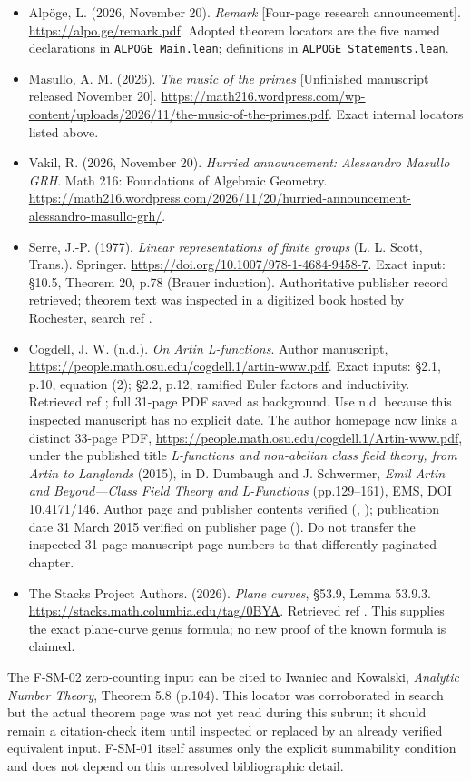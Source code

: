 \documentclass[11pt,a4paper]{article}
\providecommand{\tightlist}{\setlength{\itemsep}{0pt}\setlength{\parskip}{0pt}}
\theoremstyle{definition}\newtheorem{definition}[theorem]{Definition}
\theoremstyle{remark}\newtheorem{remark}[theorem]{Remark}
\begin{document}
\begin{itemize}
\tightlist
\item
  Alpöge, L. (2026, November 20). \emph{Remark} {[}Four-page research
  announcement{]}. \url{https://alpo.ge/remark.pdf}. Adopted theorem
  locators are the five named declarations in
  \nolinkurl{ALPOGE_Main.lean}; definitions in
  \nolinkurl{ALPOGE_Statements.lean}.
\item
  Masullo, A. M. (2026). \emph{The music of the primes} {[}Unfinished
  manuscript released November 20{]}.
  \url{https://math216.wordpress.com/wp-content/uploads/2026/11/the-music-of-the-primes.pdf}.
  Exact internal locators listed above.
\item
  Vakil, R. (2026, November 20). \emph{Hurried announcement: Alessandro
  Masullo GRH}. Math 216: Foundations of Algebraic Geometry.
  \url{https://math216.wordpress.com/2026/11/20/hurried-announcement-alessandro-masullo-grh/}.
\item
  Serre, J.-P. (1977). \emph{Linear representations of finite groups}
  (L. L. Scott, Trans.). Springer.
  \url{https://doi.org/10.1007/978-1-4684-9458-7}. Exact input: §10.5,
  Theorem 20, p.78 (Brauer induction). Authoritative publisher record
  retrieved; theorem text was inspected in a digitized book hosted by
  Rochester, search ref \nolinkurl{}.
\item
  Cogdell, J. W. (n.d.). \emph{On Artin L-functions}. Author manuscript,
  \url{https://people.math.osu.edu/cogdell.1/artin-www.pdf}. Exact
  inputs: §2.1, p.10, equation (2); §2.2, p.12, ramified Euler factors
  and inductivity. Retrieved ref \nolinkurl{}; full
  31-page PDF saved as background. Use n.d. because this inspected
  manuscript has no explicit date. The author homepage now links a
  distinct 33-page PDF,
  \url{https://people.math.osu.edu/cogdell.1/Artin-www.pdf}, under the
  published title \emph{L-functions and non-abelian class field theory,
  from Artin to Langlands} (2015), in D. Dumbaugh and J. Schwermer,
  \emph{Emil Artin and Beyond---Class Field Theory and L-Functions}
  (pp.129--161), EMS, DOI 10.4171/146. Author page and publisher
  contents verified (\nolinkurl{},
  \nolinkurl{}); publication date 31 March 2015
  verified on publisher page (\nolinkurl{}). Do not
  transfer the inspected 31-page manuscript page numbers to that
  differently paginated chapter.
\item
  The Stacks Project Authors. (2026). \emph{Plane curves}, §53.9, Lemma
  53.9.3. \url{https://stacks.math.columbia.edu/tag/0BYA}. Retrieved ref
  \nolinkurl{}. This supplies the exact plane-curve genus
  formula; no new proof of the known formula is claimed.
\end{itemize}

The F-SM-02 zero-counting input can be cited to Iwaniec and Kowalski,
\emph{Analytic Number Theory}, Theorem 5.8 (p.104). This locator was
corroborated in search but the actual theorem page was not yet read
during this subrun; it should remain a citation-check item until
inspected or replaced by an already verified equivalent input. F-SM-01
itself assumes only the explicit summability condition and does not
depend on this unresolved bibliographic detail.
\end{document}
